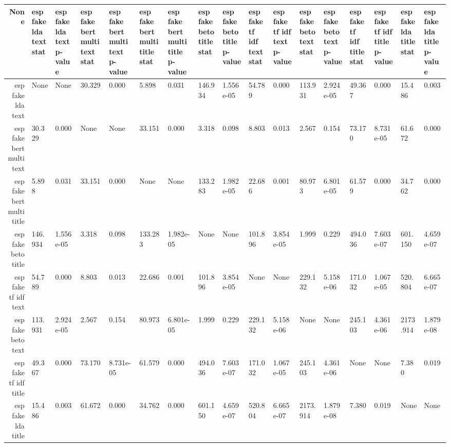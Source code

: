 \begin{tabular}{|r|l|l|l|l|l|l|l|l|l|l|l|l|l|l|l|l|}
  \hline
  None & esp fake lda text stat & esp fake lda text p-value & esp fake bert multi text stat & esp fake bert multi text p-value & esp fake bert multi title stat & esp fake bert multi title p-value & esp fake beto title stat & esp fake beto title p-value & esp fake tf idf text stat & esp fake tf idf text p-value & esp fake beto text stat & esp fake beto text p-value & esp fake tf idf title stat & esp fake tf idf title p-value & esp fake lda title stat & esp fake lda title p-value \\ 
  \hline
  esp fake lda text & None & None & 30.329 & 0.000 & 5.898 & 0.031 & 146.934 & 1.556e-05 & 54.789 & 0.000 & 113.931 & 2.924e-05 & 49.367 & 0.000 & 15.486 & 0.003 \\ 
  \hline
  esp fake bert multi text & 30.329 & 0.000 & None & None & 33.151 & 0.000 & 3.318 & 0.098 & 8.803 & 0.013 & 2.567 & 0.154 & 73.170 & 8.731e-05 & 61.672 & 0.000 \\ 
  \hline
  esp fake bert multi title & 5.898 & 0.031 & 33.151 & 0.000 & None & None & 133.283 & 1.982e-05 & 22.686 & 0.001 & 80.973 & 6.801e-05 & 61.579 & 0.000 & 34.762 & 0.000 \\ 
  \hline
  esp fake beto title & 146.934 & 1.556e-05 & 3.318 & 0.098 & 133.283 & 1.982e-05 & None & None & 101.896 & 3.854e-05 & 1.999 & 0.229 & 494.036 & 7.603e-07 & 601.150 & 4.659e-07 \\ 
  \hline
  esp fake tf idf text & 54.789 & 0.000 & 8.803 & 0.013 & 22.686 & 0.001 & 101.896 & 3.854e-05 & None & None & 229.132 & 5.158e-06 & 171.032 & 1.067e-05 & 520.804 & 6.665e-07 \\ 
  \hline
  esp fake beto text & 113.931 & 2.924e-05 & 2.567 & 0.154 & 80.973 & 6.801e-05 & 1.999 & 0.229 & 229.132 & 5.158e-06 & None & None & 245.103 & 4.361e-06 & 2173.914 & 1.879e-08 \\ 
  \hline
  esp fake tf idf title & 49.367 & 0.000 & 73.170 & 8.731e-05 & 61.579 & 0.000 & 494.036 & 7.603e-07 & 171.032 & 1.067e-05 & 245.103 & 4.361e-06 & None & None & 7.380 & 0.019 \\ 
  \hline
  esp fake lda title & 15.486 & 0.003 & 61.672 & 0.000 & 34.762 & 0.000 & 601.150 & 4.659e-07 & 520.804 & 6.665e-07 & 2173.914 & 1.879e-08 & 7.380 & 0.019 & None & None \\ 
  \hline
\end{tabular}

